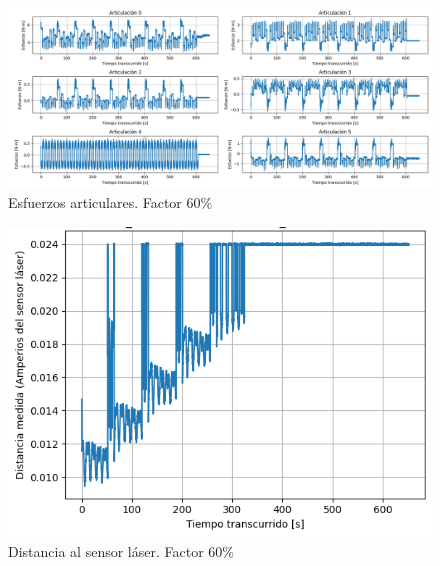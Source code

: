 \begin{figure}[H]
    \centering
    \includegraphics[scale=0.30]{figuras/ensayo_control_velocidad/esfuerzos articulares 0.6.png}
    \caption{Esfuerzos articulares. Factor 60\%}
    \label{fig:esfuerzos articulares 0.6}
\end{figure}

\begin{figure}[H]
    \centering
    \includegraphics[scale=0.50]{figuras/ensayo_control_velocidad/laser 0.6.png}
    \caption{Distancia al sensor láser. Factor 60\%}
    \label{fig:laser 0.6}
\end{figure}
